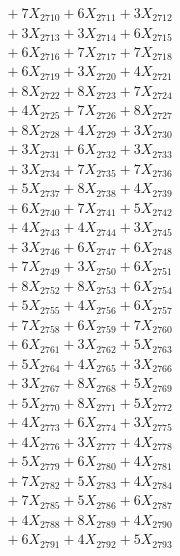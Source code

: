 \documentclass[a4paper,10pt]{article}
\begin{document}
{\begin{align}
&\;  + 7 X_{2710} + 6 X_{2711} + 3 X_{2712} \\[0.3ex]
&\;  + 3 X_{2713} + 3 X_{2714} + 6 X_{2715} \\[0.3ex]
&\;  + 6 X_{2716} + 7 X_{2717} + 7 X_{2718} \\[0.3ex]
&\;  + 6 X_{2719} + 3 X_{2720} + 4 X_{2721} \\[0.3ex]
&\;  + 8 X_{2722} + 8 X_{2723} + 7 X_{2724} \\[0.3ex]
&\;  + 4 X_{2725} + 7 X_{2726} + 8 X_{2727} \\[0.3ex]
&\;  + 8 X_{2728} + 4 X_{2729} + 3 X_{2730} \\[0.3ex]
&\;  + 3 X_{2731} + 6 X_{2732} + 3 X_{2733} \\[0.3ex]
&\;  + 3 X_{2734} + 7 X_{2735} + 7 X_{2736} \\[0.3ex]
&\;  + 5 X_{2737} + 8 X_{2738} + 4 X_{2739} \\[0.5ex]\allowbreak
&\;  + 6 X_{2740} + 7 X_{2741} + 5 X_{2742} \\[0.3ex]
&\;  + 4 X_{2743} + 4 X_{2744} + 3 X_{2745} \\[0.3ex]
&\;  + 3 X_{2746} + 6 X_{2747} + 6 X_{2748} \\[0.3ex]
&\;  + 7 X_{2749} + 3 X_{2750} + 6 X_{2751} \\[0.3ex]
&\;  + 8 X_{2752} + 8 X_{2753} + 6 X_{2754} \\[0.3ex]
&\;  + 5 X_{2755} + 4 X_{2756} + 6 X_{2757} \\[0.3ex]
&\;  + 7 X_{2758} + 6 X_{2759} + 7 X_{2760} \\[0.3ex]
&\;  + 6 X_{2761} + 3 X_{2762} + 5 X_{2763} \\[0.3ex]
&\;  + 5 X_{2764} + 4 X_{2765} + 3 X_{2766} \\[0.3ex]
&\;  + 3 X_{2767} + 8 X_{2768} + 5 X_{2769} \\[0.5ex]\allowbreak
&\;  + 5 X_{2770} + 8 X_{2771} + 5 X_{2772} \\[0.3ex]
&\;  + 4 X_{2773} + 6 X_{2774} + 3 X_{2775} \\[0.3ex]
&\;  + 4 X_{2776} + 3 X_{2777} + 4 X_{2778} \\[0.3ex]
&\;  + 5 X_{2779} + 6 X_{2780} + 4 X_{2781} \\[0.3ex]
&\;  + 7 X_{2782} + 5 X_{2783} + 4 X_{2784} \\[0.3ex]
&\;  + 7 X_{2785} + 5 X_{2786} + 6 X_{2787} \\[0.3ex]
&\;  + 4 X_{2788} + 8 X_{2789} + 4 X_{2790} \\[0.3ex]
&\;  + 6 X_{2791} + 4 X_{2792} + 5 X_{2793} \\[0.3ex]

\end{align}}
\end{document}
